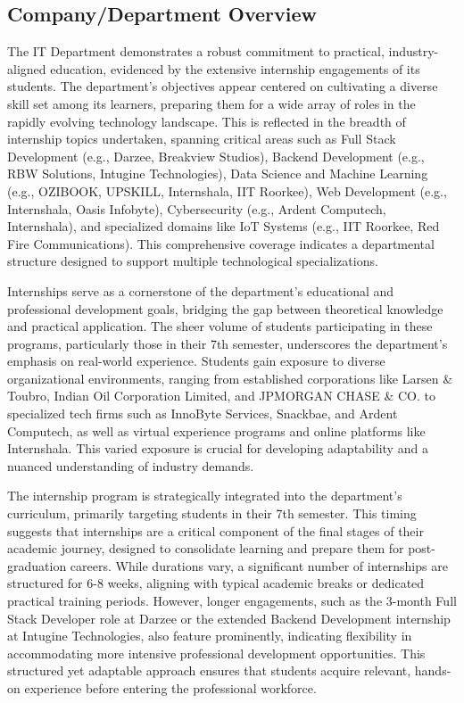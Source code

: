 \documentclass[11pt,a4paper]{article}
\newenvironment{card}{
    \begin{tcolorbox}[
        enhanced,
        colback=cardback,
        colframe=border,
        sharp corners,
        boxrule=0.5pt,
        drop shadow,
        shadow xshift=1mm,
        shadow yshift=-1mm,
        shadow color=border!50,
        boxsep=3mm,
        left=5mm, right=5mm, top=5mm, bottom=5mm,
        width=\textwidth,
        nobeforeafter
    ]
}{\end{tcolorbox}}
\begin{document}
\begin{card}
    \subsection*{\textcolor{accent}{Company/Department Overview}}
    \vspace{0.3cm}
    The IT Department demonstrates a robust commitment to practical, industry-aligned education, evidenced by the extensive internship engagements of its students. The department's objectives appear centered on cultivating a diverse skill set among its learners, preparing them for a wide array of roles in the rapidly evolving technology landscape. This is reflected in the breadth of internship topics undertaken, spanning critical areas such as Full Stack Development (e.g., Darzee, Breakview Studios), Backend Development (e.g., RBW Solutions, Intugine Technologies), Data Science and Machine Learning (e.g., OZIBOOK, UPSKILL, Internshala, IIT Roorkee), Web Development (e.g., Internshala, Oasis Infobyte), Cybersecurity (e.g., Ardent Computech, Internshala), and specialized domains like IoT Systems (e.g., IIT Roorkee, Red Fire Communications). This comprehensive coverage indicates a departmental structure designed to support multiple technological specializations.

    Internships serve as a cornerstone of the department's educational and professional development goals, bridging the gap between theoretical knowledge and practical application. The sheer volume of students participating in these programs, particularly those in their 7th semester, underscores the department's emphasis on real-world experience. Students gain exposure to diverse organizational environments, ranging from established corporations like Larsen \& Toubro, Indian Oil Corporation Limited, and JPMORGAN CHASE \& CO. to specialized tech firms such as InnoByte Services, Snackbae, and Ardent Computech, as well as virtual experience programs and online platforms like Internshala. This varied exposure is crucial for developing adaptability and a nuanced understanding of industry demands.

    The internship program is strategically integrated into the department's curriculum, primarily targeting students in their 7th semester. This timing suggests that internships are a critical component of the final stages of their academic journey, designed to consolidate learning and prepare them for post-graduation careers. While durations vary, a significant number of internships are structured for 6-8 weeks, aligning with typical academic breaks or dedicated practical training periods. However, longer engagements, such as the 3-month Full Stack Developer role at Darzee or the extended Backend Development internship at Intugine Technologies, also feature prominently, indicating flexibility in accommodating more intensive professional development opportunities. This structured yet adaptable approach ensures that students acquire relevant, hands-on experience before entering the professional workforce.
\end{card}
\end{document}
